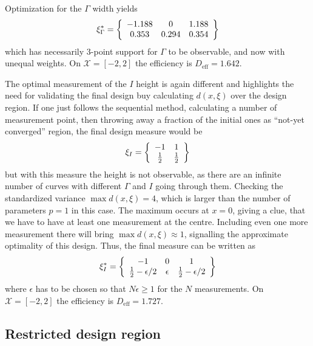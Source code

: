 \documentclass[12pt]{iopart}
\begin{document}
Optimization for the $\Gamma$ width yields
\begin{equation}
\xi^*_{\Gamma} = \left\{
  \begin{array}{c c c}
    -1.188 & 0 &  1.188 \\
    0.353 & 0.294 & 0.354\\
  \end{array} \right \}
\end{equation}
which has necessarily 3-point support for $\Gamma$ to be observable, and now with unequal weights. On $\mathcal{X} = [-2,2]$ the efficiency is $D_\mathrm{eff} = 1.642$.


The optimal measurement of the $I$ height is again different and highlights the need for validating the final design buy calculating $d(x, \xi)$ over the design region. If one just follows the sequential method, calculating a number of measurement point, then throwing away a fraction of the initial ones as ``not-yet converged'' region, the final design measure would be
\begin{equation}
\xi_{I} = \left\{
  \begin{array}{c c}
    -1 &  1 \\
    \frac{1}{2} & \frac{1}{2}\\
  \end{array} \right \}
\end{equation}
but with this measure the height is not observable, as there are an infinite number of curves with different $\Gamma$ and $I$ going through them. Checking the standardized variance $\max d(x, \xi) = 4$, which is larger than the number of parameters $p = 1$ in this case. The maximum occurs at $x = 0$, giving a clue, that we have to have at least one measurement at the centre. Including even one more measurement there will bring $\max d(x, \xi) \approx 1$, signalling the approximate optimality of this design. Thus, the final measure can be written as
\begin{equation}
\xi^*_{I} = \left\{
  \begin{array}{c c c}
    -1 & 0 &  1 \\
    \frac{1}{2}-\epsilon/2 & \epsilon & \frac{1}{2}-\epsilon/2\\
  \end{array} \right \}
\end{equation}
where $\epsilon$ has to be chosen so that $N \epsilon \geq 1$ for the $N$ measurements. On $\mathcal{X} = [-2,2]$ the efficiency is $D_\mathrm{eff} = 1.727$.

\subsection{Restricted design region}
\end{document}
